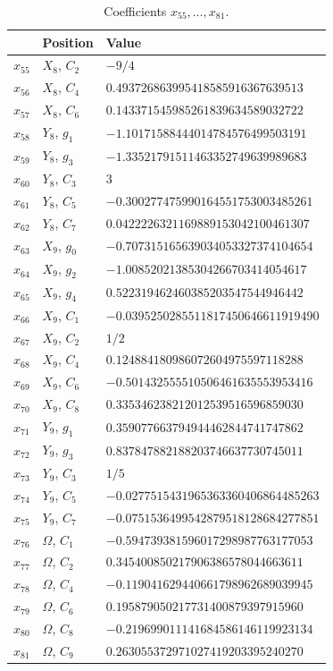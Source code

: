 \documentclass[12pt]{article}
\begin{document}
\begin{table}[H]
\centering\small
\caption{Coefficients $x_{55},\ldots,x_{81}$.}\label{tab:xc}
\begin{tabular}{lll}
\hline
 & Position & Value \\ \hline
$x_{55}$ & $X_{8}$, $C_{2}$ & $-9/4$ \\
$x_{56}$ & $X_{8}$, $C_{4}$ & $0.493726863995418585916367639513$ \\
$x_{57}$ & $X_{8}$, $C_{6}$ & $0.143371545985261839634589032722$ \\
$x_{58}$ & $Y_{8}$, $g_{1}$ & $-1.10171588444014784576499503191$ \\
$x_{59}$ & $Y_{8}$, $g_{3}$ & $-1.33521791511463352749639989683$ \\
$x_{60}$ & $Y_{8}$, $C_{3}$ & $3$ \\
$x_{61}$ & $Y_{8}$, $C_{5}$ & $-0.300277475990164551753003485261$ \\
$x_{62}$ & $Y_{8}$, $C_{7}$ & $0.0422226321169889153042100461307$ \\
$x_{63}$ & $X_{9}$, $g_{0}$ & $-0.707315165639034053327374104654$ \\
$x_{64}$ & $X_{9}$, $g_{2}$ & $-1.00852021385304266703414054617$ \\
$x_{65}$ & $X_{9}$, $g_{4}$ & $0.522319462460385203547544946442$ \\
$x_{66}$ & $X_{9}$, $C_{1}$ & $-0.0395250285511817450646611919490$ \\
$x_{67}$ & $X_{9}$, $C_{2}$ & $1/2$ \\
$x_{68}$ & $X_{9}$, $C_{4}$ & $0.124884180986072604975597118288$ \\
$x_{69}$ & $X_{9}$, $C_{6}$ & $-0.501432555510506461635553953416$ \\
$x_{70}$ & $X_{9}$, $C_{8}$ & $0.335346238212012539516596859030$ \\
$x_{71}$ & $Y_{9}$, $g_{1}$ & $0.359077663794944462844741747862$ \\
$x_{72}$ & $Y_{9}$, $g_{3}$ & $0.837847882188203746637730745011$ \\
$x_{73}$ & $Y_{9}$, $C_{3}$ & $1/5$ \\
$x_{74}$ & $Y_{9}$, $C_{5}$ & $-0.0277515431965363360406864485263$ \\
$x_{75}$ & $Y_{9}$, $C_{7}$ & $-0.0751536499542879518128684277851$ \\
$x_{76}$ & $\Omega$, $C_{1}$ & $-0.594739381596017298987763177053$ \\
$x_{77}$ & $\Omega$, $C_{2}$ & $0.345400850217906386578044663611$ \\
$x_{78}$ & $\Omega$, $C_{4}$ & $-0.119041629440661798962689039945$ \\
$x_{79}$ & $\Omega$, $C_{6}$ & $0.195879050217731400879397915960$ \\
$x_{80}$ & $\Omega$, $C_{8}$ & $-0.219699011141684586146119923134$ \\
$x_{81}$ & $\Omega$, $C_{9}$ & $0.263055372971027419203395240270$ \\ \hline
\end{tabular}
\end{table}
\end{document}

